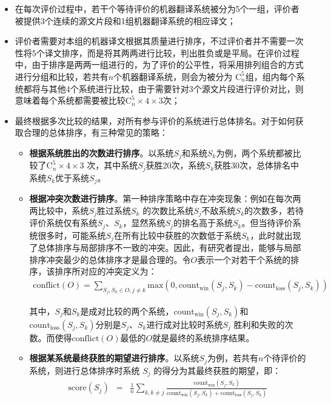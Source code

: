 \begin{itemize}
\vspace{0.5em}
\item 在每次评价过程中，若干个等待评价的机器翻译系统被分为5个一组，评价者被提供3个连续的源文片段和1组机器翻译系统的相应译文；
\vspace{0.5em}
\item 评价者需要对本组的机器译文根据其质量进行排序，不过评价者并不需要一次性将5个译文排序，而是将其两两进行比较，判出胜负或是平局。在评价过程中，由于排序是两两一组进行的，为了评价的公平性，将采用排列组合的方式进行分组和比较，若共有$n$个机器翻译系统，则会为被分为 $\textrm{C}_n^5$组，组内每个系统都将与其他4个系统进行比较，由于需要针对3个源文片段进行评价对比，则意味着每个系统都需要被比较$\textrm{C}_n^5 \times 4 \times 3$次；
\vspace{0.5em}
\item 最终根据多次比较的结果，对所有参与评价的系统进行总体排名。对于如何获取合理的总体排序，有三种常见的策略：
    \begin{itemize}
    \item {\small\sffamily\bfseries{根据系统胜出的次数进行排序}}。以系统${S}_j$和系统${S}_k$为例，两个系统都被比较了$\textrm{C}_n^5 \times 4 \times 3$ 次，其中系统${S}_j$获胜20次，系统${S}_k$获胜30次，总体排名中系统${S}_k$优于系统${S}_j$。
    \item  {\small\sffamily\bfseries{根据冲突次数进行排序}}。第一种排序策略中存在冲突现象：例如在每次两两比较中，系统${S}_j$胜过系统${S}_k$ 的次数比系统${S}_j$不敌系统${S}_k$的次数多，若待评价系统仅有系统${S}_j$、${S}_k$，显然系统${S}_j$的排名高于系统${S}_k$。但当待评价系统很多时，可能系统${S}_j$在所有比较中获胜的次数低于系统${S}_k$，此时就出现了总体排序与局部排序不一致的冲突。因此，有研究者提出，能够与局部排序冲突最少的总体排序才是最合理的。令$O$表示一个对若干个系统的排序，该排序所对应的冲突定义为：
\begin{eqnarray}
\textrm{conflict}(O) =\sum\limits_{{{S}_j},{{S}_k} \in O,j \ne k} {{\textrm{max}}(0,\textrm{count}_{\textrm{win}}({{S}_j},{{S}_k}) - \textrm{count}_{\textrm{loss}}({{S}_j},{{S}_k}))}
\label{eq:4-1}
\end{eqnarray}

其中，${S}_j$和${S}_k$是成对比较的两个系统，$\textrm{count}_{\textrm{win}}({S}_j,{S}_k)$和$\textrm{count}_{\textrm{loss}}({S}_j,{S}_k)$分别是${S}_j$、${S}_k$进行成对比较时系统${S}_j$ 胜利和失败的次数。而使得$\textrm{conflict}(O)$最低的$O$就是最终的系统排序结果。
    \item {\small\sffamily\bfseries{根据某系统最终获胜的期望进行排序}}。以系统${S}_j$为例，若共有$n$个待评价的系统，则进行总体排序时系统 ${S}_j$ 的得分为其最终获胜的期望，即：
\begin{eqnarray}
\textrm{score}({{S}_j}) &=& \frac{1}{n}\sum\limits_{k,k \ne j} {\frac{\textrm{count}_{\textrm{win}}({{S}_j},{{S}_k})}{{\textrm{count}_{\textrm{win}}({{S}_j},{{S}_k}) + \textrm{count}_{\textrm{loss}}({{S}_j},{{S}_k})}}}
\label{eq:4-2}
\end{eqnarray}


\end{itemize}
\end{itemize}

